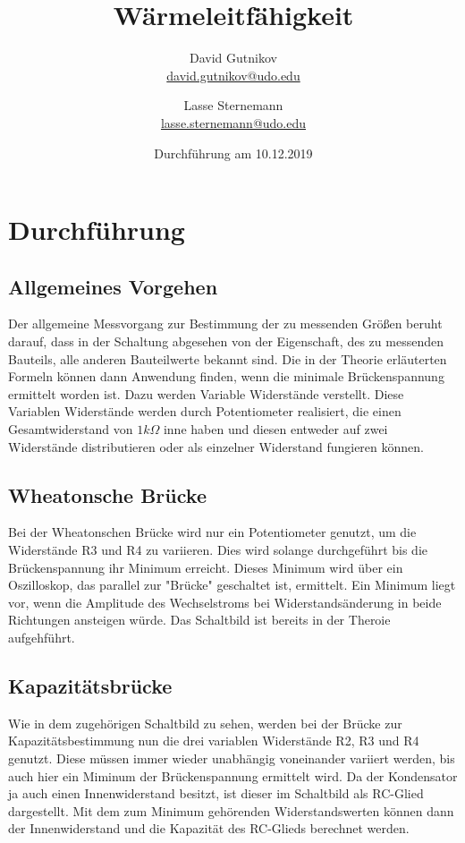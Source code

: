 \documentclass[titlepage = firstcover]{scrartcl}
\title{Wärmeleitfähigkeit}
\author{
  David Gutnikov\\
  \href{mailto:david.gutnikov@udo.edu}{david.gutnikov@udo.edu}
 \and 
  Lasse Sternemann\\
  \href{mailto:lasse.sternemann@udo.edu}{lasse.sternemann@udo.edu}
}
\date{Durchführung am 10.12.2019}
\begin{document}
  \maketitle
  \newpage
  \tableofcontents
  \newpage

  \section{Durchführung}

  \subsection{Allgemeines Vorgehen}
  Der allgemeine Messvorgang zur Bestimmung der zu messenden Größen beruht darauf, dass in der Schaltung abgesehen von der Eigenschaft, des zu messenden 
  Bauteils, alle anderen Bauteilwerte bekannt sind. Die in der Theorie erläuterten Formeln können dann Anwendung finden, wenn die minimale Brückenspannung
  ermittelt worden ist. Dazu werden Variable Widerstände verstellt. Diese Variablen Widerstände werden durch Potentiometer realisiert, die einen 
  Gesamtwiderstand von $1k\Omega$ inne haben und diesen entweder auf zwei Widerstände distributieren oder als einzelner Widerstand fungieren können.

  \subsection{Wheatonsche Brücke}
  Bei der Wheatonschen Brücke wird nur ein Potentiometer genutzt, um die Widerstände R3 und R4 zu variieren. Dies wird solange durchgeführt bis die 
  Brückenspannung ihr Minimum erreicht. Dieses Minimum wird über ein Oszilloskop, das parallel zur "Brücke" geschaltet ist, ermittelt. Ein Minimum liegt 
  vor, wenn die Amplitude des Wechselstroms bei Widerstandsänderung in beide Richtungen ansteigen würde. Das Schaltbild ist bereits in der Theroie 
  aufgehführt. 

  \subsection{Kapazitätsbrücke}
  Wie in dem zugehörigen Schaltbild zu sehen, werden bei der Brücke zur Kapazitätsbestimmung nun die drei variablen Widerstände R2, R3 und R4 genutzt. Diese 
  müssen immer wieder unabhängig voneinander variiert werden, bis auch hier ein Miminum der Brückenspannung ermittelt wird. Da der Kondensator ja auch einen 
  Innenwiderstand besitzt, ist dieser im Schaltbild als RC-Glied dargestellt. Mit dem zum Minimum gehörenden Widerstandswerten können dann der Innenwiderstand 
  und die Kapazität des RC-Glieds berechnet werden.
\end{document}
